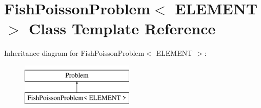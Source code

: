 \hypertarget{classFishPoissonProblem}{}\section{Fish\+Poisson\+Problem$<$ E\+L\+E\+M\+E\+NT $>$ Class Template Reference}
\label{classFishPoissonProblem}
Inheritance diagram for Fish\+Poisson\+Problem$<$ E\+L\+E\+M\+E\+NT $>$\+:\begin{figure}[H]
\begin{center}
\leavevmode
\includegraphics[height=2.000000cm]{classFishPoissonProblem}
\end{center}
\end{figure}
